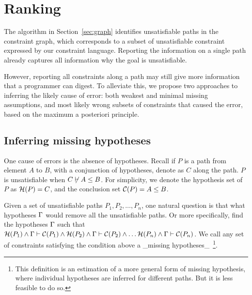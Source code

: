 % 
% 
% 
% 
% 
% 
\section{Ranking}
\label{sec:ranking}

The algorithm in Section~\ref{sec:graph} identifies unsatisfiable paths in the
constraint graph, which corresponds to a subset of unsatisfiable constraint
expressed by our constraint language. Reporting the information on a single
path already captures all information why the goal is unsatisfiable.

However, reporting all constraints along a path may still give more
information that a programmer can digest. To alleviate this, we
propose two approaches to inferring the likely cause of error: both
weakest and minimal missing assumptions, and most likely wrong subsets
of constraints that caused the error, based on the maximum a posteriori
principle.
 
\subsection{Inferring missing hypotheses}
\label{sec:assumptions}

One cause of errors is the absence of hypotheses.
Recall if $P$ is a path from element $A$ to $B$, with a conjunction
of hypotheses, denote as $C$ along the path. $P$ is unsatisfiable when
$C\not\vdash A\leq B$. For simplicity, we denote the hypothesis set
of $P$ as $\mathcal{H}(P)=C$, and the conclusion set
$\mathcal{C}(P)=A\leq B$.

Given a set of unsatisfiable paths $P_1, P_2, \dots,  P_n$, one natural
question is that what hypotheses $\Gamma$ would remove all the unsatisfiable
paths. Or more specifically, find the hypotheses $\Gamma$ such that 
%
$\mathcal{H}(P_1) \land \Gamma \vdash \mathcal{C}(P_1) \land
\mathcal{H}(P_2) \land \Gamma \vdash \mathcal{C}(P_2) \land \dots
\mathcal{H}(P_n) \land \Gamma \vdash \mathcal{C}(P_n)$.
%
We call any set of constraints satisfying the condition above a
_missing hypotheses_~\footnote{This definition is an estimation of a
more general form of missing hypothesis, where individual hypotheses
are inferred for different paths. But it is less feasible to do so.}.

